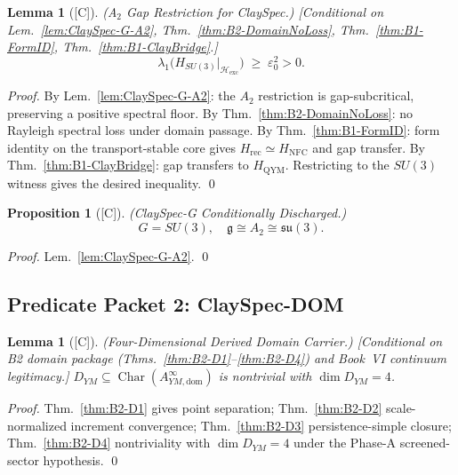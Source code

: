 \documentclass[12pt,oneside]{amsbook}
\theoremstyle{plain}
\newtheorem{lemma}[theorem]{Lemma}
\newtheorem{proposition}[theorem]{Proposition}
\theoremstyle{definition}
\theoremstyle{remark}
\newcommand{\status}[1]{\textup{[#1]}}
\begin{document}
\begin{lemma}[\status{C}]\label{lem:A2-gap-restriction-ClaySpec}
\textup{(A$_2$ Gap Restriction for ClaySpec.)}
\textup{[Conditional on Lem.~\ref{lem:ClaySpec-G-A2},
Thm.~\ref{thm:B2-DomainNoLoss}, Thm.~\ref{thm:B1-FormID},
Thm.~\ref{thm:B1-ClayBridge}.]}
\[
 \lambda_1\!\bigl(H_{SU(3)}|_{\mathcal{H}_{\mathrm{exc}}}\bigr)
 \;\ge\; \varepsilon_0^2 > 0.
\]
\end{lemma}

\begin{proof}
By Lem.~\ref{lem:ClaySpec-G-A2}: the $A_2$ restriction is gap-subcritical,
preserving a positive spectral floor.
By Thm.~\ref{thm:B2-DomainNoLoss}: no Rayleigh spectral loss under
domain passage.
By Thm.~\ref{thm:B1-FormID}: form identity on the transport-stable core
gives $H_{\mathrm{rec}}\simeq H_{\mathrm{NFC}}$ and gap transfer.
By Thm.~\ref{thm:B1-ClayBridge}: gap transfers to $H_{\mathrm{QYM}}$.
Restricting to the $SU(3)$ witness gives the desired inequality.
\qed
\end{proof}

\begin{proposition}[\status{C}]\label{prop:ClaySpec-G}
\textup{(ClaySpec-G Conditionally Discharged.)}
\[
 \boxed{G = SU(3),\quad \mathfrak{g}\cong A_2\cong\mathfrak{su}(3).}
\]
\end{proposition}

\begin{proof}
Lem.~\ref{lem:ClaySpec-G-A2}.
\qed
\end{proof}

\subsection{Predicate Packet 2: ClaySpec-DOM}

\begin{lemma}[\status{C}]\label{lem:ClaySpec-DOM-4Carrier}
\textup{(Four-Dimensional Derived Domain Carrier.)}
\textup{[Conditional on B2 domain package (Thms.~\ref{thm:B2-D1}--\ref{thm:B2-D4})
and Book~VI continuum legitimacy.]}
$D_{YM}\subseteq\operatorname{Char}(A^\infty_{YM,\mathrm{dom}})$ is
nontrivial with $\dim D_{YM}=4$.
\end{lemma}

\begin{proof}
Thm.~\ref{thm:B2-D1} gives point separation; Thm.~\ref{thm:B2-D2}
scale-normalized increment convergence; Thm.~\ref{thm:B2-D3}
persistence-simple closure; Thm.~\ref{thm:B2-D4} nontriviality with
$\dim D_{YM}=4$ under the Phase-A screened-sector hypothesis.
\qed
\end{proof}
\end{document}
